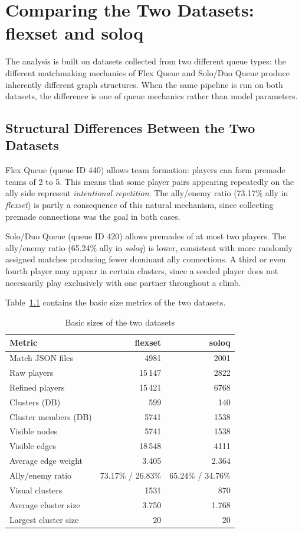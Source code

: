 \chapter{Comparing the Two Datasets: flexset and soloq}

The analysis is built on datasets collected from two different queue types: the different matchmaking mechanics of Flex Queue and Solo/Duo Queue produce inherently different graph structures. When the same pipeline is run on both datasets, the difference is one of queue mechanics rather than model parameters.

\section{Structural Differences Between the Two Datasets}

Flex Queue (queue ID 440) allows team formation: players can form premade teams of 2 to 5. This means that some player pairs appearing repeatedly on the ally side represent \emph{intentional repetition}. The ally/enemy ratio (73.17\% ally in \textit{flexset}) is partly a consequence of this natural mechanism, since collecting premade connections was the goal in both cases.

Solo/Duo Queue (queue ID 420) allows premades of at most two players. The ally/enemy ratio (65.24\% ally in \textit{soloq}) is lower, consistent with more randomly assigned matches producing fewer dominant ally connections. A third or even fourth player may appear in certain clusters, since a seeded player does not necessarily play exclusively with one partner throughout a climb.

Table~\ref{tab:dataset-sizes} contains the basic size metrics of the two datasets.

\begin{table}[H]
\centering
\caption{Basic sizes of the two datasets}
\label{tab:dataset-sizes}
\begin{tabularx}{\textwidth}{|>{\raggedright\arraybackslash}p{5cm}|r|r|}
\hline
\textbf{Metric} & \textbf{flexset} & \textbf{soloq} \\
\hline
Match JSON files & 4981 & 2001 \\
Raw players & 15\,147 & 2822 \\
Refined players & 15\,421 & 6768 \\
Clusters (DB) & 599 & 140 \\
Cluster members (DB) & 5741 & 1538 \\
Visible nodes & 5741 & 1538 \\
Visible edges & 18\,548 & 4111 \\
Average edge weight & 3.405 & 2.364 \\
Ally/enemy ratio & 73.17\% / 26.83\% & 65.24\% / 34.76\% \\
Visual clusters & 1531 & 870 \\
Average cluster size & 3.750 & 1.768 \\
Largest cluster size & 20 & 20 \\
\hline
\end{tabularx}
\end{table}

